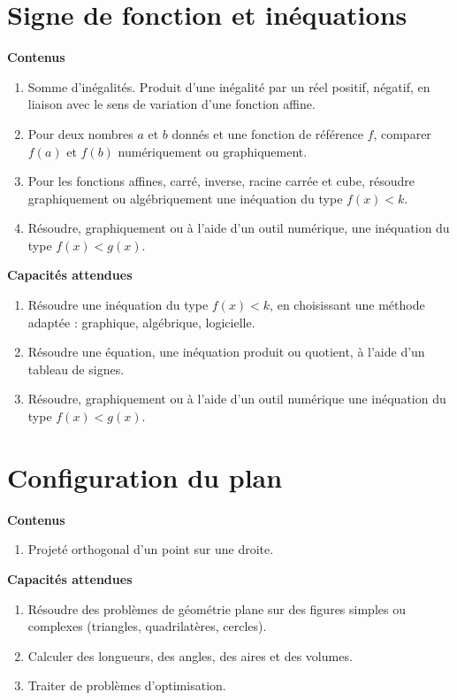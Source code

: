 \documentclass[10pt,a4paper]{article}
\begin{document}
\section{Signe de fonction et inéquations}

\textbf{Contenus}

\begin{enumerate}
\item Somme d'inégalités. Produit d'une inégalité par un réel positif, négatif, en liaison avec le sens de variation d'une fonction affine.
\item Pour deux nombres $a$ et $b$ donnés et une fonction de référence $f$, comparer $f(a)$ et $f(b)$ numériquement ou graphiquement.
\item  Pour les fonctions affines, carré, inverse, racine carrée et cube, résoudre 
graphiquement ou algébriquement une inéquation du type $f(x) < k$. 
\item Résoudre, graphiquement ou à l'aide d'un outil numérique, une inéquation du type $f(x) < g(x)$.
\end{enumerate}

\textbf{Capacités attendues}

\begin{enumerate}
\item  Résoudre une inéquation du type $f(x) < k$, en choisissant une méthode adaptée : graphique, algébrique, logicielle.
\item  Résoudre une équation, une inéquation produit ou quotient, à l'aide d'un tableau de 
signes.
\item  Résoudre, graphiquement ou à l'aide d'un outil numérique une inéquation du type $f(x) < g(x)$.
\end{enumerate}

 
 

\section{Configuration du plan}

\textbf{Contenus}

\begin{enumerate}
\item Projeté orthogonal d’un point sur une droite.
\end{enumerate}

\textbf{Capacités attendues}
 
\begin{enumerate}
\item Résoudre des problèmes de géométrie plane sur des figures simples ou complexes 
(triangles, quadrilatères, cercles).
\item  Calculer des longueurs, des angles, des aires et des volumes.
\item  Traiter de problèmes d’optimisation.
\end{enumerate}
\end{document}
